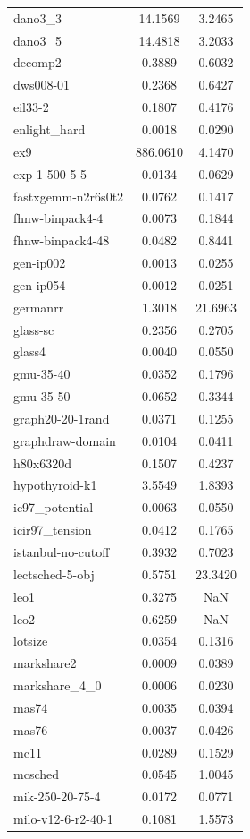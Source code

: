 \begin{longtable}{lcc}
dano3_3 & 14.1569 & 3.2465 \\
dano3_5 & 14.4818 & 3.2033 \\
decomp2 & 0.3889 & 0.6032 \\
dws008-01 & 0.2368 & 0.6427 \\
eil33-2 & 0.1807 & 0.4176 \\
enlight_hard & 0.0018 & 0.0290 \\
ex9 & 886.0610 & 4.1470 \\
exp-1-500-5-5 & 0.0134 & 0.0629 \\
fastxgemm-n2r6s0t2 & 0.0762 & 0.1417 \\
fhnw-binpack4-4 & 0.0073 & 0.1844 \\
fhnw-binpack4-48 & 0.0482 & 0.8441 \\
gen-ip002 & 0.0013 & 0.0255 \\
gen-ip054 & 0.0012 & 0.0251 \\
germanrr & 1.3018 & 21.6963 \\
glass-sc & 0.2356 & 0.2705 \\
glass4 & 0.0040 & 0.0550 \\
gmu-35-40 & 0.0352 & 0.1796 \\
gmu-35-50 & 0.0652 & 0.3344 \\
graph20-20-1rand & 0.0371 & 0.1255 \\
graphdraw-domain & 0.0104 & 0.0411 \\
h80x6320d & 0.1507 & 0.4237 \\
hypothyroid-k1 & 3.5549 & 1.8393 \\
ic97_potential & 0.0063 & 0.0550 \\
icir97_tension & 0.0412 & 0.1765 \\
istanbul-no-cutoff & 0.3932 & 0.7023 \\
lectsched-5-obj & 0.5751 & 23.3420 \\
leo1 & 0.3275 & NaN \\
leo2 & 0.6259 & NaN \\
lotsize & 0.0354 & 0.1316 \\
markshare2 & 0.0009 & 0.0389 \\
markshare_4_0 & 0.0006 & 0.0230 \\
mas74 & 0.0035 & 0.0394 \\
mas76 & 0.0037 & 0.0426 \\
mc11 & 0.0289 & 0.1529 \\
mcsched & 0.0545 & 1.0045 \\
mik-250-20-75-4 & 0.0172 & 0.0771 \\
milo-v12-6-r2-40-1 & 0.1081 & 1.5573 \\

\end{longtable}
